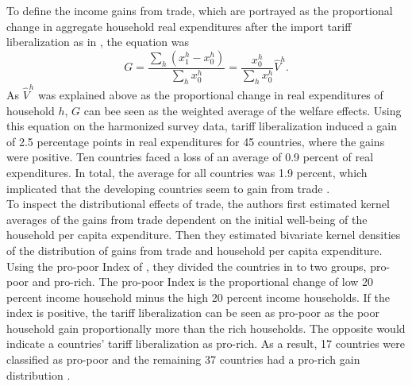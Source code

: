 To define the income gains from trade, which are portrayed as the proportional change in aggregate household real expenditures
after the import tariff liberalization as in \cite{Arkolakis.2012}, the equation was 
\begin{equation} \label{eq:equation12}
    G = \frac{\sum_{h}(x_{1}^h-x_{0}^h)}{\sum_{h}x_{0}^h} = \frac{x_{0}^h}{\sum_{h}x_{0}^h}\hat{V}^h.
\end{equation}
As \(\hat{V}^h\) was explained above as the proportional change in real expenditures of household \(h\), \(G\) can bee seen as 
the weighted average of the welfare effects. Using this equation on the harmonized survey data, tariff liberalization induced 
a gain of 2.5 percentage points in real expenditures for 45 countries, where the gains were positive. Ten countries faced a loss of
an average of 0.9 percent of real expenditures. In total, the average for all countries was 1.9 percent, which implicated that
the developing countries seem to gain from trade \parencite[p.~14]{Artuc.2019}.\\

To inspect the distributional effects of trade, the authors first estimated kernel averages of the gains from trade dependent on
the initial well-being of the household per capita expenditure. Then they estimated bivariate kernel densities of the distribution
of gains from trade and household per capita expenditure. Using the pro-poor Index of \cite{Nicita.2014},
they divided the countries in to two groups, pro-poor and pro-rich. The pro-poor Index is the proportional change of low
20 percent income household minus the high 20 percent income households. If the index is positive, the tariff liberalization
can be seen as pro-poor as the poor household gain proportionally more than the rich households. The opposite would indicate
a countries' tariff liberalization as pro-rich. As a result, 17 countries were classified as pro-poor and the remaining 37 countries
had a pro-rich gain distribution \parencite[p.~15]{Artuc.2019}.


